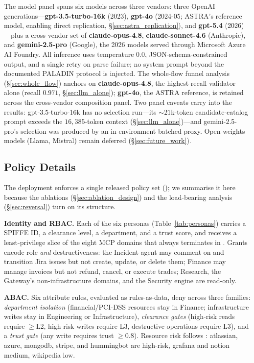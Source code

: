 \documentclass[sigconf,review,anonymous]{acmart}
\begin{document}
The model panel spans six models across three vendors: three OpenAI generations---\textbf{gpt-3.5-turbo-16k} (2023), \textbf{gpt-4o} (2024-05; ASTRA's reference model, enabling direct replication, \S\ref{sec:astra_replication}), and \textbf{gpt-5.4} (2026)---plus a cross-vendor set of \textbf{claude-opus-4.8}, \textbf{claude-sonnet-4.6} (Anthropic), and \textbf{gemini-2.5-pro} (Google), the 2026 models served through Microsoft Azure AI Foundry. All inference uses temperature $0.0$, JSON-schema-constrained output, and a single retry on parse failure; no system prompt beyond the documented PALADIN protocol is injected. The whole-flow funnel analysis (\S\ref{sec:whole_flow}) anchors on \textbf{claude-opus-4.8}, the highest-recall validator alone (recall $0.971$, \S\ref{sec:llm_alone}); \textbf{gpt-4o}, the ASTRA reference, is retained across the cross-vendor composition panel. Two panel caveats carry into the results: gpt-3.5-turbo-16k has no selection run---its $\sim\!21$k-token candidate-catalog prompt exceeds the $16{,}385$-token context (\S\ref{sec:llm_alone})---and gemini-2.5-pro's selection was produced by an in-environment batched proxy. Open-weights models (Llama, Mistral) remain deferred (\S\ref{sec:future_work}).

\subsection{Policy Details}
\label{sec:policy_details}

The deployment enforces a single released policy set (); we summarise it here because the ablations (\S\ref{sec:ablation_design}) and the load-bearing analysis (\S\ref{sec:reversal}) turn on its structure.

\textbf{Identity and RBAC.} Each of the six personas (Table~\ref{tab:personas}) carries a SPIFFE ID, a clearance level, a department, and a trust score, and receives a least-privilege slice of the eight MCP domains that always terminates in . Grants encode role \emph{and} destructiveness: the Incident agent may comment on and transition Jira issues but not create, update, or delete them; Finance may manage invoices but not refund, cancel, or execute trades; Research, the Gateway's non-infrastructure domains, and the Security engine are read-only.

\textbf{ABAC.} Six attribute rules, evaluated as rules-as-data, deny across three families: \emph{department isolation} (financial/PCI-DSS resources stay in Finance; infrastructure writes stay in Engineering or Infrastructure), \emph{clearance gates} (high-risk reads require $\geq$L2, high-risk writes require L3, destructive operations require L3), and a \emph{trust gate} (any write requires trust $\geq 0.8$). Resource risk follows : atlassian, azure, mongodb, stripe, and hummingbot are high-risk, grafana and notion medium, wikipedia low.
\end{document}
